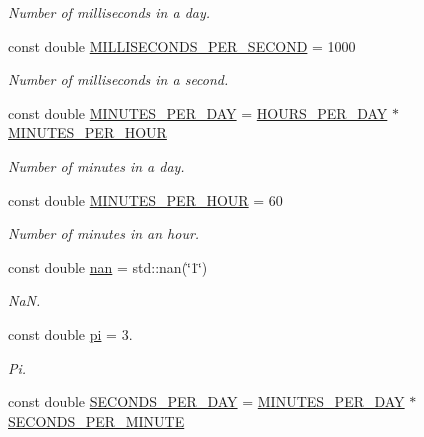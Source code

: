 \begin{DoxyCompactItemize}
\begin{DoxyCompactList}\small\item\em Number of milliseconds in a day. \end{DoxyCompactList}\item 
const double \mbox{\hyperlink{namespace_num_c_1_1_constants_afd12b2de704ba918ed887fac0eb2600f}{M\+I\+L\+L\+I\+S\+E\+C\+O\+N\+D\+S\+\_\+\+P\+E\+R\+\_\+\+S\+E\+C\+O\+ND}} = 1000
\begin{DoxyCompactList}\small\item\em Number of milliseconds in a second. \end{DoxyCompactList}\item 
const double \mbox{\hyperlink{namespace_num_c_1_1_constants_adbd98a7e2c52b9a4617f314c0b2c5be8}{M\+I\+N\+U\+T\+E\+S\+\_\+\+P\+E\+R\+\_\+\+D\+AY}} = \mbox{\hyperlink{namespace_num_c_1_1_constants_a56c169b380c3327b81d5c10f9ae8cc09}{H\+O\+U\+R\+S\+\_\+\+P\+E\+R\+\_\+\+D\+AY}} $\ast$ \mbox{\hyperlink{namespace_num_c_1_1_constants_ad866f0ac14005c8c3e2a09f396a3aab3}{M\+I\+N\+U\+T\+E\+S\+\_\+\+P\+E\+R\+\_\+\+H\+O\+UR}}
\begin{DoxyCompactList}\small\item\em Number of minutes in a day. \end{DoxyCompactList}\item 
const double \mbox{\hyperlink{namespace_num_c_1_1_constants_ad866f0ac14005c8c3e2a09f396a3aab3}{M\+I\+N\+U\+T\+E\+S\+\_\+\+P\+E\+R\+\_\+\+H\+O\+UR}} = 60
\begin{DoxyCompactList}\small\item\em Number of minutes in an hour. \end{DoxyCompactList}\item 
const double \mbox{\hyperlink{namespace_num_c_1_1_constants_ad6d765bc43000564045c8bf410c88000}{nan}} = std\+::nan(\char`\"{}1\char`\"{})
\begin{DoxyCompactList}\small\item\em NaN. \end{DoxyCompactList}\item 
const double \mbox{\hyperlink{namespace_num_c_1_1_constants_ac07ff0b2814a1c724a541e2952b6ce62}{pi}} = 3.
\begin{DoxyCompactList}\small\item\em Pi. \end{DoxyCompactList}\item 
const double \mbox{\hyperlink{namespace_num_c_1_1_constants_a0679151e1b64bb3d5a0d005893a4fe3e}{S\+E\+C\+O\+N\+D\+S\+\_\+\+P\+E\+R\+\_\+\+D\+AY}} = \mbox{\hyperlink{namespace_num_c_1_1_constants_adbd98a7e2c52b9a4617f314c0b2c5be8}{M\+I\+N\+U\+T\+E\+S\+\_\+\+P\+E\+R\+\_\+\+D\+AY}} $\ast$ \mbox{\hyperlink{namespace_num_c_1_1_constants_af8489b57825b7d3355fd0e3da0e4ad62}{S\+E\+C\+O\+N\+D\+S\+\_\+\+P\+E\+R\+\_\+\+M\+I\+N\+U\+TE}}

\end{DoxyCompactItemize}
